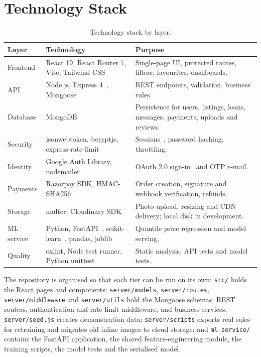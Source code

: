 \documentclass[11pt,letterpaper,oneside]{report}
\newcommand{\code}[1]{\texttt{#1}}
\begin{document}
\section{Technology Stack}
\begin{table}[h]
\centering
\caption{Technology stack by layer.}\label{tab:stack}
\small
\begin{tabularx}{\textwidth}{@{}L{2.0cm}L{4.0cm}X@{}}
\toprule
\textbf{Layer} & \textbf{Technology} & \textbf{Purpose}\\
\midrule
Frontend & React 19, React Router 7, Vite, Tailwind CSS~\cite{react} & Single-page UI, protected routes, filters, favourites, dashboards.\\
API & Node.js, Express 4~\cite{express}, Mongoose & REST endpoints, validation, business rules.\\
Database & MongoDB~\cite{mongodb} & Persistence for users, listings, loans, messages, payments, uploads and reviews.\\
Security & jsonwebtoken, bcryptjs, express-rate-limit & Sessions~\cite{jwt}, password hashing, throttling.\\
Identity & Google Auth Library, nodemailer & OAuth 2.0 sign-in~\cite{oauth} and OTP e-mail.\\
Payments & Razorpay SDK, HMAC-SHA256~\cite{hmac} & Order creation, signature and webhook verification, refunds.\\
Storage & multer, Cloudinary SDK~\cite{cloudinary} & Photo upload, resizing and CDN delivery; local disk in development.\\
ML service & Python, FastAPI~\cite{fastapi}, scikit-learn~\cite{sklearn}, pandas, joblib & Quantile price regression and model serving.\\
Quality & oxlint, Node test runner, Python unittest & Static analysis, API tests and model tests.\\
\bottomrule
\end{tabularx}
\end{table}

The repository is organised so that each tier can be run on its own: \code{src/} holds the React pages
and components; \code{server/models}, \code{server/routes}, \code{server/middleware} and \code{server/utils}
hold the Mongoose schemas, REST routers, authentication and rate-limit middleware, and business services;
\code{server/seed.js} creates demonstration data; \code{server/scripts} exports real sales for retraining and
migrates old inline images to cloud storage; and \code{ml-service/} contains the FastAPI application, the
shared feature-engineering module, the training scripts, the model tests and the serialised model.
\end{document}
